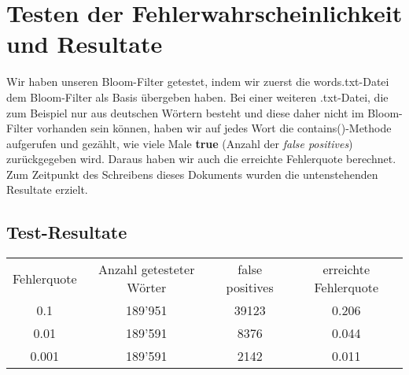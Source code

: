 \documentclass[a4paper,12pt]{article}
\begin{document}
\section{Testen der Fehlerwahrscheinlichkeit und Resultate}
Wir haben unseren Bloom-Filter getestet, indem wir zuerst die words.txt-Datei dem Bloom-Filter als Basis übergeben haben. Bei einer weiteren .txt-Datei, die zum Beispiel nur aus deutschen Wörtern besteht und diese daher nicht im Bloom-Filter vorhanden sein können, haben wir auf jedes Wort die contains()-Methode aufgerufen und gezählt, wie viele Male \textbf{true} (Anzahl der \textit{false positives}) zurückgegeben wird. Daraus haben wir auch die erreichte Fehlerquote berechnet.
Zum Zeitpunkt des Schreibens dieses Dokuments wurden die untenstehenden Resultate erzielt.
\subsection{Test-Resultate}
	\begin{tabular}{cccc}
Fehlerquote & Anzahl getesteter Wörter & false positives & erreichte Fehlerquote \\
0.1 & 189'951 & 39123 & 0.206\\
0.01 & 189'591 & 8376 & 0.044 \\
0.001 & 189'591 & 2142 & 0.011\\
	\end{tabular}
\end{document}
